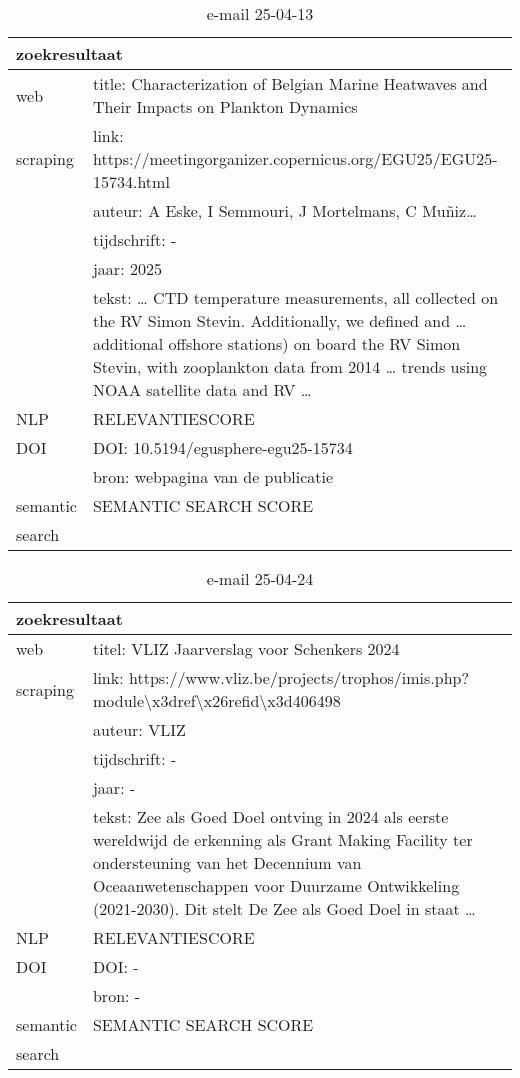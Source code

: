 \begin{table}[h!]
    \caption{e-mail 25-04-13}
    \centering
    \begin{tabularx}{\textwidth}{|p{4cm}|X|} 
        \hline
        \multicolumn{2}{|X|}{\textbf{zoekresultaat}} \\
        \hline
        web &title: Characterization of Belgian Marine Heatwaves and Their Impacts on Plankton Dynamics\\
        scraping&link: https://meetingorganizer.copernicus.org/EGU25/EGU25-15734.html\\
        &auteur: A Eske, I Semmouri, J Mortelmans, C Muñiz…\\
        &tijdschrift: -\\
        &jaar: 2025\\
        &tekst: … CTD temperature measurements, all collected on the RV Simon Stevin. Additionally, we defined and … additional offshore stations) on board the RV Simon Stevin, with zooplankton data from 2014 … trends using NOAA satellite data and RV …\\
        \hline
        NLP&RELEVANTIESCORE\\
        \hline
        DOI&DOI: 10.5194/egusphere-egu25-15734\\
        &bron: webpagina van de publicatie\\
        \hline
        semantic&SEMANTIC SEARCH SCORE\\
        search&\\
        \hline
    \end{tabularx}
    \label{table:email20250413}
\end{table}
\begin{table}[h!]
    \caption{e-mail 25-04-24}
    \centering
    \begin{tabularx}{\textwidth}{|p{4cm}|X|} 
        \hline
        \multicolumn{2}{|X|}{\textbf{zoekresultaat}} \\
        \hline
        web &titel: VLIZ Jaarverslag voor Schenkers 2024\\
        scraping&link: https://www.vliz.be/projects/trophos/imis.php?module\textbackslash x3dref\textbackslash x26refid\textbackslash x3d406498\\
        &auteur: VLIZ\\
        &tijdschrift: -\\
        &jaar: -\\
        &tekst: Zee als Goed Doel ontving in 2024 als eerste wereldwijd de erkenning als Grant Making Facility ter ondersteuning van het Decennium van Oceaanwetenschappen voor Duurzame Ontwikkeling (2021-2030). Dit stelt De Zee als Goed Doel in staat …\\
        \hline
        NLP&RELEVANTIESCORE\\
        \hline
        DOI&DOI: -\\
        &bron: -\\
        \hline
        semantic&SEMANTIC SEARCH SCORE\\
        search&\\
        \hline
    \end{tabularx}
    \label{table:email20250424}
\end{table}
